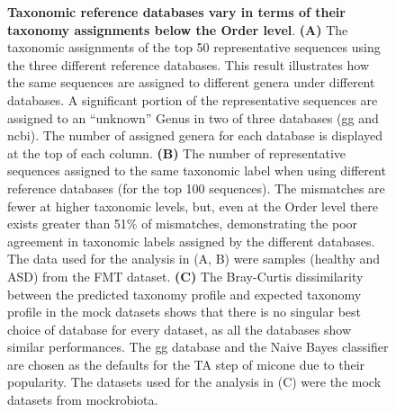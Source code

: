   \begin{figure}[H]
    \centering
    \caption{
      \textbf{Taxonomic reference databases vary in terms of their taxonomy assignments below the Order level}.
      \textbf{(A)} The taxonomic assignments of the top 50 representative sequences using the three different reference databases.
      This result illustrates how the same sequences are assigned to different genera under different databases.
      A significant portion of the representative sequences are assigned to an ``unknown'' Genus in two of three databases (\ac{gg} and \ac{ncbi}).
      The number of assigned genera for each database is displayed at the top of each column.
      \textbf{(B)} The number of representative sequences assigned to the same taxonomic label when using different reference databases (for the top 100 sequences).
      The mismatches are fewer at higher taxonomic levels, but, even at the Order level there exists greater than 51\% of mismatches, demonstrating the poor agreement in taxonomic labels assigned by the different databases.
      The data used for the analysis in (A, B) were samples (healthy and ASD) from the FMT dataset.
      \textbf{(C)} The Bray-Curtis dissimilarity between the predicted taxonomy profile and expected taxonomy profile in the mock datasets shows that there is no singular best choice of database for every dataset, as all the databases show similar performances.
      The \ac{gg} database and the Naive Bayes classifier are chosen as the defaults for the TA step of \ac{micone} due to their popularity.
      The datasets used for the analysis in (C) were the mock datasets from mockrobiota.
    }
    \label{fig:figure3}
  \end{figure}


